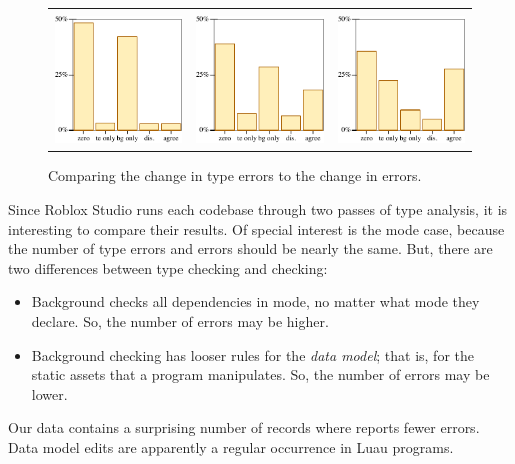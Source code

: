 \documentclass[english,submission,cleveref]{programming}
\begin{document}
\begin{figure}[t]\centering
  \begin{tabular}{lll}
    \mnocheck{} & \mnonstrict{} & \mstrict{} \\
    \includegraphics[width=0.3\columnwidth]{img/compass-nocheck.pdf}
    &
    \includegraphics[width=0.3\columnwidth]{img/compass-nonstrict.pdf}
    &
    \includegraphics[width=0.3\columnwidth]{img/compass-strict.pdf}
  \end{tabular}
  \caption{Comparing the change in type errors to the change in \FS{} errors.}
  \label{f:tefs-compass}
\end{figure}

Since Roblox Studio runs each codebase through two passes of type analysis,
it is interesting to compare their results.
Of special interest is the \mstrict{} mode case, because the number of
type errors and \FS{} errors should be nearly the same.
But, there are two differences between \mstrict{} type checking
and \FS{} checking:
\begin{itemize}
  \item
    Background checks all dependencies in \mstrict{} mode, no matter
    what mode they declare.
    So, the number of \FS{} errors may be higher.
  \item
    Background checking has looser rules for the \emph{data model};
    that is, for the static assets that a program manipulates.
    So, the number of \FS{} errors may be lower.
\end{itemize}
Our data contains a surprising number of records where \FS{}
reports fewer errors.
Data model edits are apparently a regular occurrence in Luau programs.
\end{document}
